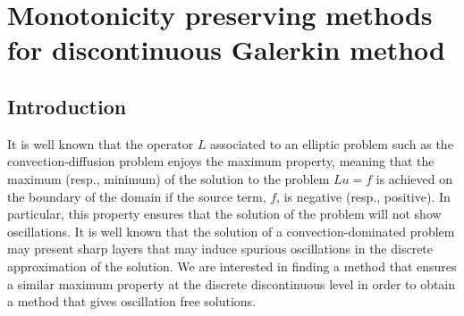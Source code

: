 \chapter{Monotonicity preserving methods for discontinuous Galerkin method}
\label{chap-paper2}

\section{Introduction}

It is well known that the operator $L$ associated to an elliptic problem such as the convection-diffusion problem enjoys the maximum property, meaning that the maximum (resp., minimum) of the solution to the problem $Lu=f$ is achieved on the boundary of the domain if the source term, $f$, is negative (resp., positive). 
In particular, this property ensures that the solution of the problem will not show oscillations. It is well known that the solution of a convection-dominated problem may present sharp layers that may induce spurious oscillations in the discrete approximation of the solution. We are interested in finding a method that ensures a similar maximum property at the discrete discontinuous level in order to obtain a method that gives oscillation free solutions.

